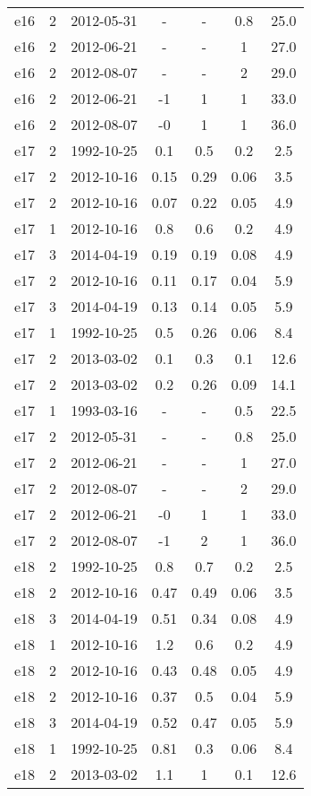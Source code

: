 \begin{table*}[htp]
\begin{tabular}{ccccccc}
e16 & 2 & 2012-05-31 & - & - & 0.8 & 25.0 \\
e16 & 2 & 2012-06-21 & - & - & 1 & 27.0 \\
e16 & 2 & 2012-08-07 & - & - & 2 & 29.0 \\
e16 & 2 & 2012-06-21 & -1 & 1 & 1 & 33.0 \\
e16 & 2 & 2012-08-07 & -0 & 1 & 1 & 36.0 \\
e17 & 2 & 1992-10-25 & 0.1 & 0.5 & 0.2 & 2.5 \\
e17 & 2 & 2012-10-16 & 0.15 & 0.29 & 0.06 & 3.5 \\
e17 & 2 & 2012-10-16 & 0.07 & 0.22 & 0.05 & 4.9 \\
e17 & 1 & 2012-10-16 & 0.8 & 0.6 & 0.2 & 4.9 \\
e17 & 3 & 2014-04-19 & 0.19 & 0.19 & 0.08 & 4.9 \\
e17 & 2 & 2012-10-16 & 0.11 & 0.17 & 0.04 & 5.9 \\
e17 & 3 & 2014-04-19 & 0.13 & 0.14 & 0.05 & 5.9 \\
e17 & 1 & 1992-10-25 & 0.5 & 0.26 & 0.06 & 8.4 \\
e17 & 2 & 2013-03-02 & 0.1 & 0.3 & 0.1 & 12.6 \\
e17 & 2 & 2013-03-02 & 0.2 & 0.26 & 0.09 & 14.1 \\
e17 & 1 & 1993-03-16 & - & - & 0.5 & 22.5 \\
e17 & 2 & 2012-05-31 & - & - & 0.8 & 25.0 \\
e17 & 2 & 2012-06-21 & - & - & 1 & 27.0 \\
e17 & 2 & 2012-08-07 & - & - & 2 & 29.0 \\
e17 & 2 & 2012-06-21 & -0 & 1 & 1 & 33.0 \\
e17 & 2 & 2012-08-07 & -1 & 2 & 1 & 36.0 \\
e18 & 2 & 1992-10-25 & 0.8 & 0.7 & 0.2 & 2.5 \\
e18 & 2 & 2012-10-16 & 0.47 & 0.49 & 0.06 & 3.5 \\
e18 & 3 & 2014-04-19 & 0.51 & 0.34 & 0.08 & 4.9 \\
e18 & 1 & 2012-10-16 & 1.2 & 0.6 & 0.2 & 4.9 \\
e18 & 2 & 2012-10-16 & 0.43 & 0.48 & 0.05 & 4.9 \\
e18 & 2 & 2012-10-16 & 0.37 & 0.5 & 0.04 & 5.9 \\
e18 & 3 & 2014-04-19 & 0.52 & 0.47 & 0.05 & 5.9 \\
e18 & 1 & 1992-10-25 & 0.81 & 0.3 & 0.06 & 8.4 \\
e18 & 2 & 2013-03-02 & 1.1 & 1 & 0.1 & 12.6 \\

\end{tabular}
\end{table*}
